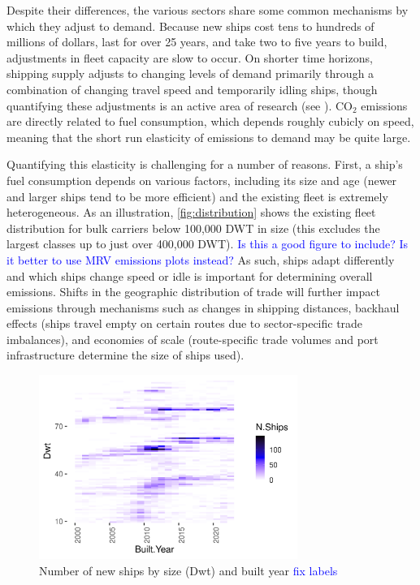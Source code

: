\documentclass[hidelinks, 12pt,letterpaper]{article}
\begin{document}
Despite their differences, the various sectors share some common mechanisms by which they adjust to demand. Because new ships cost tens to hundreds of millions of dollars, last for over 25 years, and take two to five years to build, adjustments in fleet capacity are slow to occur. On shorter time horizons, shipping supply adjusts to changing levels of demand primarily through a combination of changing travel speed and temporarily idling ships, though quantifying these adjustments is an active area of research (see \citet*{adland2018dynamic, ollila2022effect,assmann2015missing}). CO$_2$ emissions are directly related to fuel consumption, which depends roughly cubicly on speed, meaning that the short run elasticity of emissions to demand may be quite large.

Quantifying this elasticity is challenging for a number of reasons. First, a ship's fuel consumption depends on various factors, including its size and age (newer and larger ships tend to be more efficient) and the existing fleet is extremely heterogeneous. As an illustration, \autoref{fig:distribution} shows the existing fleet distribution for bulk carriers below 100,000 DWT in size (this excludes the largest classes up to just over 400,000 DWT).
\textcolor{blue}{Is this a good figure to include? Is it better to use MRV emissions plots instead?}
As such, ships adapt differently and which ships change speed or idle is important for determining overall emissions.
Shifts in the geographic distribution of trade will further impact emissions through mechanisms such as changes in shipping distances, backhaul effects (ships travel empty on certain routes due to sector-specific trade imbalances), and economies of scale (route-specific trade volumes and port infrastructure determine the size of ships used).


\begin{figure}[h]
  \centering
  \includegraphics[width = 0.75\textwidth]{WFR_Bulkers_Exploration_Size_Built_heatmap.png}
  \caption{Number of new ships by size (Dwt) and built year \textcolor{blue}{fix labels}
}
  \label{fig:distribution}
\end{figure}
\end{document}
